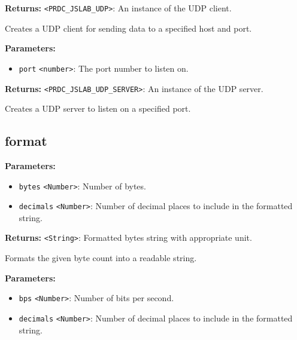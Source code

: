 \documentclass[12pt,a4paper]{article}
\begin{document}
\noindent \textbf{Returns:} \texttt{<PRDC\_JSLAB\_UDP>}: An instance of the UDP client.

\noindent Creates a UDP client for sending data to a specified host and port.

\vspace{5mm}
\noindent {}


\noindent \textbf{Parameters:}
\begin{itemize}
  \item \texttt{port} \texttt{<number>}: The port number to listen on.
\end{itemize}

\noindent \textbf{Returns:} \texttt{<PRDC\_JSLAB\_UDP\_SERVER>}: An instance of the UDP server.

\noindent Creates a UDP server to listen on a specified port.


\subsection{format}
\vspace{5mm}
\noindent {}


\noindent \textbf{Parameters:}
\begin{itemize}
  \item \texttt{bytes} \texttt{<Number>}: Number of bytes.
  \item \texttt{decimals} \texttt{<Number>}: Number of decimal places to include in the formatted string.
\end{itemize}

\noindent \textbf{Returns:} \texttt{<String>}: Formatted bytes string with appropriate unit.

\noindent Formats the given byte count into a readable string.

\vspace{5mm}
\noindent {}


\noindent \textbf{Parameters:}
\begin{itemize}
  \item \texttt{bps} \texttt{<Number>}: Number of bits per second.
  \item \texttt{decimals} \texttt{<Number>}: Number of decimal places to include in the formatted string.
\end{itemize}
\end{document}
